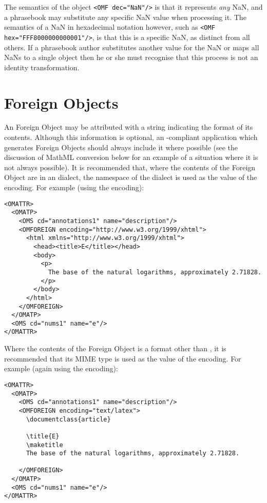 The semantics of the \OM object \lstinline|<OMF dec="NaN"/>| is that it represents
\emph{any} NaN, and a phrasebook may substitute any specific NaN value when processing it.
The semantics of a NaN in hexadecimal notation however, such as 
\lstinline|<OMF hex="FFF8000000000001"/>|, is that this is a specific NaN, as distinct from all others.
If a phrasebook author substitutes another value for the NaN or maps all NaNs to a single
object then he or she must recognise that this process is not an identity transformation.

\section{\OM Foreign Objects}\label{sec_compl_omforeign}

An \OM Foreign Object may be attributed with a string indicating the format of its
contents.  Although this information is optional, an \OM-compliant application which
generates \OM Foreign Objects should always include it where possible (see the discussion
of MathML conversion below for an example of a situation where it is not always possible).
It is recommended that, where the contents of the Foreign Object are in an \XML dialect,
the namespace \cite{xmlns} of the \XML dialect is used as the value of the encoding.  For
example (using the \XML encoding):
\begin{lstlisting}
<OMATTR>
  <OMATP>
    <OMS cd="annotations1" name="description"/>
    <OMFOREIGN encoding="http://www.w3.org/1999/xhtml">
      <html xmlns="http://www.w3.org/1999/xhtml">
        <head><title>E</title></head>
        <body>
          <p>
            The base of the natural logarithms, approximately 2.71828.
          </p>
        </body>
      </html>
    </OMFOREIGN>
  </OMATP>
  <OMS cd="nums1" name="e"/>
</OMATTR>
\end{lstlisting}
Where the contents of the Foreign Object is a format other than \XML, it is recommended
that its MIME type \cite{rfc2046} is used as the value of the encoding.  For example
(again using the \XML encoding):
\begin{lstlisting}
<OMATTR>
  <OMATP>
    <OMS cd="annotations1" name="description"/>
    <OMFOREIGN encoding="text/latex">
      \documentclass{article}
      
      \title{E}
      \maketitle
      The base of the natural logarithms, approximately 2.71828.
      
    </OMFOREIGN>
  </OMATP>
  <OMS cd="nums1" name="e"/>
</OMATTR>
\end{lstlisting}

